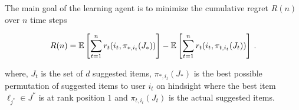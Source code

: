   


The main goal of the learning agent is to minimize the cumulative regret $R(n)$  over $n$ time steps

\begin{align*}
  R(n) =
  \mathbb{E}\left[\sum_{t = 1}^n r_t(i_t, \pi_{\ast, i_t}(J_\ast))\right] - \mathbb{E}\left[\sum_{t = 1}^n r_t(i_t, \pi_{t, i_t}(J_t))\right]\,.
\end{align*}

where, $J_t$ is the set of $d$ suggested items, $\pi_{\ast, i_t}(J_\ast)$ is the best possible permutation of suggested items to user $i_t$ on hindsight where the best item $\ell_{j^*}\in J^*$ is at rank position $1$ and $\pi_{t, i_t}(J_t)$ is the actual suggested items.


%
%
